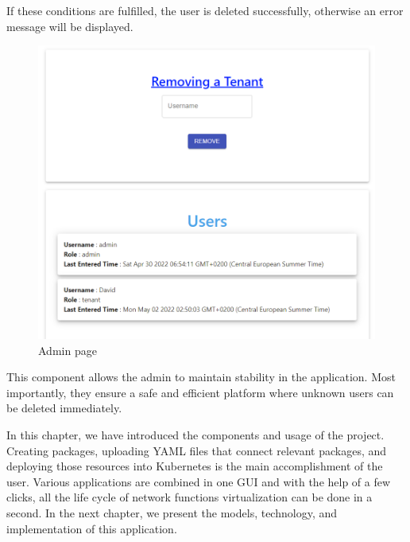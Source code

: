 If these conditions are fulfilled, the user is deleted successfully, otherwise an error message will be displayed.

\begin{figure}[H]
	\centering
	\includegraphics[width=140mm]{images/admin-component.png}
	\caption{Admin page}
	\label{ssec:admin-component}
\end{figure}

This component allows the admin to maintain stability in the application. Most importantly, they ensure a safe and efficient platform where unknown users can be deleted immediately. 

In this chapter, we have introduced the components and usage of the project. Creating packages, uploading YAML files that connect relevant packages, and deploying those resources into Kubernetes is the main accomplishment of the user. Various applications are combined in one GUI and with the help of a few clicks, all the life cycle of network functions virtualization can be done in a second. In the next chapter, we present the models, technology, and implementation of this application.
